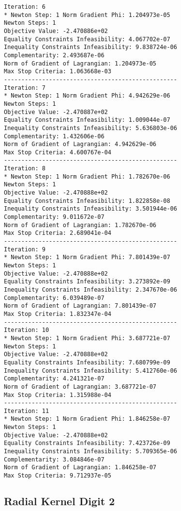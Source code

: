 \documentclass{article}
\begin{document}
\begin{minipage}[t]{0.45\textwidth}
\begin{verbatim}
Iteration: 6
* Newton Step: 1 Norm Gradient Phi: 1.204973e-05
Newton Steps: 1
Objective Value: -2.470886e+02
Equality Constraints Infeasibility: 4.067702e-07
Inequality Constraints Infeasibility: 9.838724e-06
Complementarity: 2.493687e-06
Norm of Gradient of Lagrangian: 1.204973e-05
Max Stop Criteria: 1.063668e-03
--------------------------------------------------
Iteration: 7
* Newton Step: 1 Norm Gradient Phi: 4.942629e-06
Newton Steps: 1
Objective Value: -2.470887e+02
Equality Constraints Infeasibility: 1.009044e-07
Inequality Constraints Infeasibility: 5.636803e-06
Complementarity: 1.432606e-06
Norm of Gradient of Lagrangian: 4.942629e-06
Max Stop Criteria: 4.600767e-04
--------------------------------------------------
Iteration: 8
* Newton Step: 1 Norm Gradient Phi: 1.782670e-06
Newton Steps: 1
Objective Value: -2.470888e+02
Equality Constraints Infeasibility: 1.822858e-08
Inequality Constraints Infeasibility: 3.501944e-06
Complementarity: 9.011672e-07
Norm of Gradient of Lagrangian: 1.782670e-06
Max Stop Criteria: 2.689041e-04
--------------------------------------------------
Iteration: 9
* Newton Step: 1 Norm Gradient Phi: 7.801439e-07
Newton Steps: 1
Objective Value: -2.470888e+02
Equality Constraints Infeasibility: 3.273892e-09
Inequality Constraints Infeasibility: 2.347670e-06
Complementarity: 6.039489e-07
Norm of Gradient of Lagrangian: 7.801439e-07
Max Stop Criteria: 1.832347e-04
--------------------------------------------------
Iteration: 10
* Newton Step: 1 Norm Gradient Phi: 3.687721e-07
Newton Steps: 1
Objective Value: -2.470888e+02
Equality Constraints Infeasibility: 7.680799e-09
Inequality Constraints Infeasibility: 5.412760e-06
Complementarity: 4.241321e-07
Norm of Gradient of Lagrangian: 3.687721e-07
Max Stop Criteria: 1.315988e-04
--------------------------------------------------
Iteration: 11
* Newton Step: 1 Norm Gradient Phi: 1.846258e-07
Newton Steps: 1
Objective Value: -2.470888e+02
Equality Constraints Infeasibility: 7.423726e-09
Inequality Constraints Infeasibility: 5.709365e-06
Complementarity: 3.084846e-07
Norm of Gradient of Lagrangian: 1.846258e-07
Max Stop Criteria: 9.712937e-05
\end{verbatim}
\end{minipage}

\subsection{Radial Kernel Digit 2}\label{radial2}
\end{document}
